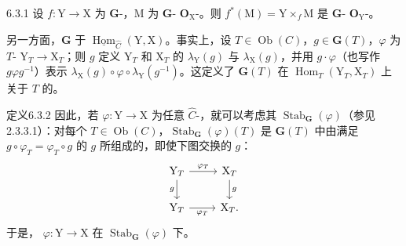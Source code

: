 \begin{SGAresult}{}{6.3.1}
设 $f:\mathrm Y\to\mathrm X$ 为 $\mathbf G$-，$\mathrm M$ 为 $\mathbf G$- $\mathbf O_{\mathrm X}$-。则 $f^*(\mathrm M)=\mathrm Y\times_f\mathrm M$ 是 $\mathbf G$- $\mathbf O_{\mathrm Y}$-。
\end{SGAresult}
另一方面，$\mathbf G$ 于 $\underline{\operatorname{Hom}}_{\widehat C}(\mathrm Y,\mathrm X)$。事实上，设 $T\in\operatorname{Ob}(C)$，$g\in\mathbf G(T)$，$\varphi$ 为 $T$- $\mathrm Y_T\to\mathrm X_T$；则 $g$ 定义 $\mathrm Y_T$ 和 $\mathrm X_T$ 的 $\lambda_{\mathrm Y}(g)$ 与 $\lambda_{\mathrm X}(g)$，并用 $g\cdot\varphi$（也写作 $g\varphi g^{-1}$）表示 $\lambda_{\mathrm X}(g)\circ\varphi\circ\lambda_{\mathrm Y}(g^{-1})$。这定义了 $\mathbf G(T)$ 在 $\operatorname{Hom}_T(\mathrm Y_T,\mathrm X_T)$ 上关于 $T$ 的。
\begin{SGAresult}{定义}{6.3.2}
因此，若 $\varphi:\mathrm Y\to\mathrm X$ 为任意 $\widehat C$-，就可以考虑其 $\operatorname{Stab}_{\mathbf G}(\varphi)$（参见 2.3.3.1）：对每个 $T\in\operatorname{Ob}(C)$，$\operatorname{Stab}_{\mathbf G}(\varphi)(T)$ 是 $\mathbf G(T)$ 中由满足 $g\circ\varphi_T=\varphi_T\circ g$ 的 $g$ 所组成的，即使下图交换的 $g$：
\[
\begin{tikzcd}
\mathrm Y_T\arrow[r,"{\varphi_T}"]\arrow[d,"{g}"']&\mathrm X_T\arrow[d,"{g}"]\\
\mathrm Y_T\arrow[r,"{\varphi_T}"']&\mathrm X_T.
\end{tikzcd}
\]
于是， $\varphi:\mathrm Y\to\mathrm X$ 在 $\operatorname{Stab}_{\mathbf G}(\varphi)$ 下。
\end{SGAresult}

